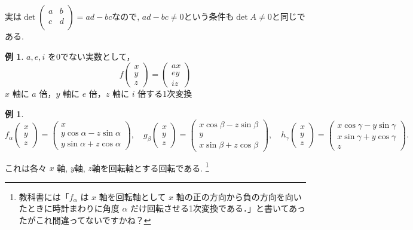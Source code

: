 \documentclass[dvipdfmx,a4paper,11pt]{article} %
\theoremstyle{definition}
\newtheorem{exa}[thm]{例}
\begin{document}
実は$\det \begin{pmatrix}
 a& b \\
  c& d\\
 \end{pmatrix} = ad-bc$なので, 
$ad - bc \neq 0$という条件も$\det A \neq 0$と同じである. 

\begin{exa}
\( a,e,i \) を0でない実数として，
\[
f
\begin{pmatrix}
x\\
y\\
z
\end{pmatrix}
=
\begin{pmatrix}
ax\\
ey\\
iz
\end{pmatrix}
\]
\( x \) 軸に \( a \) 倍，\( y \) 軸に \( e \) 倍，\( z \) 軸に \( i \) 倍する1次変換
\end{exa}

\begin{exa}

\[
f_\alpha
\begin{pmatrix}
x\\
y\\
z
\end{pmatrix}
=
\begin{pmatrix}
x\\
y\cos\alpha-z\sin\alpha\\
y\sin\alpha+z\cos\alpha
\end{pmatrix},
\quad
g_\beta
\begin{pmatrix}
x\\
y\\
z
\end{pmatrix}
=
\begin{pmatrix}
x\cos\beta-z\sin\beta\\
y\\
x\sin\beta+z\cos\beta
\end{pmatrix},\quad
h_\gamma
\begin{pmatrix}
x\\
y\\
z
\end{pmatrix}
=
\begin{pmatrix}
x\cos\gamma-y\sin\gamma\\
x\sin\gamma+y\cos\gamma\\
z
\end{pmatrix}.
\]

これは各々 \( x \) 軸, $y$軸, $z$軸を回転軸とする回転である. \footnote{教科書には「\( f_{\alpha} \) は \( x \) 軸を回転軸として \( x \) 軸の正の方向から負の方向を向いたときに時計まわりに角度 \( \alpha \) だけ回転させる1次変換である．」と書いてあったがこれ間違ってないですかね？}
\end{exa}
\end{document}
